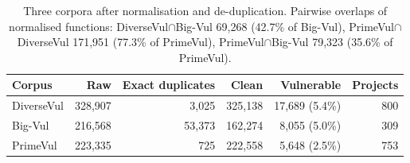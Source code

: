 \begin{table}[t]
\centering\footnotesize
\caption{Three corpora after normalisation and de-duplication. Pairwise overlaps of normalised functions: DiverseVul$\cap$Big-Vul 69,268 (42.7\% of Big-Vul), PrimeVul$\cap$DiverseVul 171,951 (77.3\% of PrimeVul), PrimeVul$\cap$Big-Vul 79,323 (35.6\% of PrimeVul).}\label{tab:data3}
\begin{tabular}{lrrrrr}
\toprule
Corpus & Raw & Exact duplicates & Clean & Vulnerable & Projects \\
\midrule
DiverseVul & 328,907 & 3,025 & 325,138 & 17,689 (5.4\%) & 800 \\
Big-Vul & 216,568 & 53,373 & 162,274 & 8,055 (5.0\%) & 309 \\
PrimeVul & 223,335 & 725 & 222,558 & 5,648 (2.5\%) & 753 \\
\bottomrule
\end{tabular}
\end{table}
